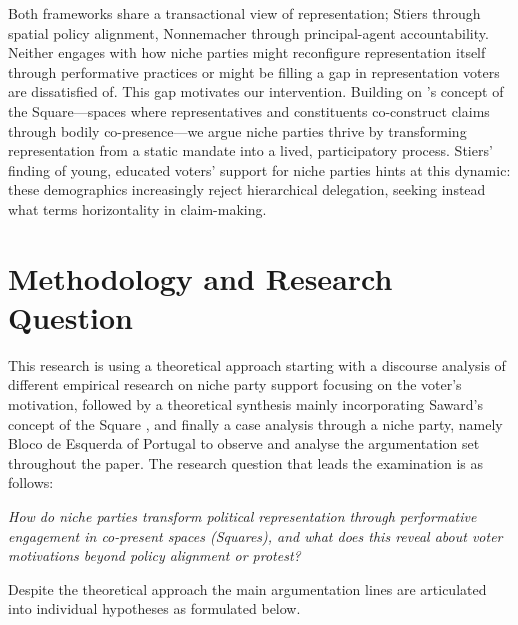 Both frameworks share a transactional view of representation; Stiers through spatial policy alignment, Nonnemacher through principal-agent accountability. Neither engages with how niche parties might reconfigure representation itself through performative practices or might be filling a gap in representation voters are dissatisfied of. This gap motivates our intervention. Building on \textcite{saward2024}'s concept of the Square—spaces where representatives and constituents co-construct claims through bodily co-presence—we argue niche parties thrive by transforming representation from a static mandate into a lived, participatory process. Stiers’ finding of young, educated voters' support for niche parties \parencite[7]{stiers2024} hints at this dynamic: these demographics increasingly reject hierarchical delegation, seeking instead what \textcite{kim2024} terms horizontality in claim-making.

\section{Methodology and Research Question}\label{sec:Methodology and Research Question} %

This research is using a theoretical approach starting with a discourse
analysis of different empirical research on niche party support focusing on the
voter's motivation, followed by a theoretical synthesis mainly incorporating
Saward's concept of the Square \parencite[]{saward2024}, and finally a case
analysis through a niche party, namely Bloco de Esquerda of Portugal to observe
and analyse the argumentation set throughout the paper. The research question
that leads the examination is as follows:

\emph{How do niche parties transform political representation through performative engagement in co-present spaces (Squares), and what does this reveal about voter motivations beyond policy alignment or protest?}

Despite the theoretical approach the main argumentation lines are articulated
into individual hypotheses as formulated below.

